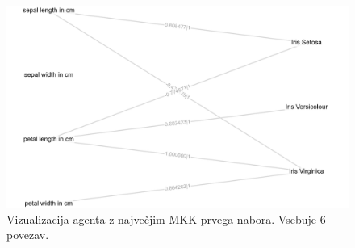 \begin{figure}[H]
    \begin{center}
        \includegraphics[width=13cm]{iris/1/mcc_g}
    \end{center}
    \caption{Vizualizacija agenta z največjim MKK prvega nabora. Vsebuje 6 povezav.}
    \label{fig:iris_mcc_1_g}
\end{figure}

\newpage

